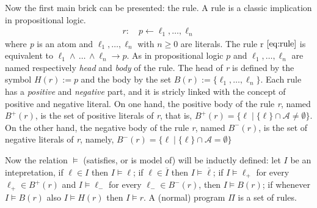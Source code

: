 Now the first main brick can be presented: the rule.
A rule is a classic implication in propositional logic.
\begin{align}\label{eq:rule}
    r: \quad p \leftarrow \ell_1, \ldots, \ell_n
\end{align}
where \textit{p} is an atom and $\ell_1, \ldots, \ell_n$ with $n \ge 0$ are literals.
The rule r  $\ref{eq:rule}$ is equivalent to $\ell_1 \land\, \ldots \, \land  \ell_n \rightarrow p$.
As in propositional logic $p$ and $\ell_1, \ldots, \ell_n$ are named respectively \textit{head}
and \textit{body} of the rule.
The head of \textit{r} is defined by the symbol $\mathit{H}(r) := p$
and the body by the set
$\mathit{B}(r) := \{\ell_1, \ldots, \ell_n \}$.
Each rule has a \textit{positive} and \textit{negative} part, and it is stricly 
linked with the concept of positive and negative literal.
On one hand, the positive body of the rule \textit{r}, named $\mathit{B}^+(r)$, is the set
of positive literals of \textit{r}, that is, 
$\mathit{B}^+(r) = \{ \ell \mid \{\ell\} \cap \mathcal{A} \ne \emptyset \}$.
On the other hand, the negative body of the rule \textit{r}, named $\mathit{B}^-(r)$, is the set
of negative literals of \textit{r}, namely, 
$\mathit{B}^-(r) = \{ \ell \mid \{\ell\} \cap \mathcal{A} = \emptyset \}$

Now the relation $\models$ (satisfies, or is model of) will be inductly 
defined: let $I$ be an intepretation, if $\ell \in I$ then $I \models \ell$;
if $\ell \in \overline{I}$ then $I \models \overline{\ell}$;
if $I \models \ell_+$ for every $\ell_+ \in B^+(r)$ and 
$I \models \ell_-$ for every $\ell_-\in B^-(r)$, then $I \models B(r)$;
if whenever $I \models B(r)$ also $I \models H(r)$ then $I \models r$.
A (normal) program $\Pi$ is a set of rules.

